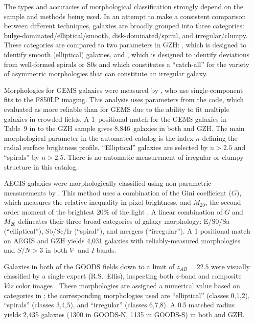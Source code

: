 \documentclass[twocolumn]{aastex6}
\begin{document}
The types and accuracies of morphological classification strongly depend on the sample and methods being used. In an attempt to make a consistent comparison between different techniques, galaxies are broadly grouped into three categories: bulge-dominated/elliptical/smooth, disk-dominated/spiral, and irregular/clumpy. These categories are compared to two parameters in GZH: \pbest, which is designed to identify smooth (elliptical) galaxies, and \podd, which is designed to identify deviations from well-formed spirals or S0s and which constitutes a ``catch-all'' for the variety of asymmetric morphologies that can constitute an irregular galaxy. 

Morphologies for GEMS galaxies were measured by \citet{hau07}, who use single-component \sersic{} fits to the F850LP imaging. This analysis uses parameters from the \galfit{} code, which \citet{hau07} evaluated as more reliable than \gimtwod{} for GEMS due to the ability to fit multiple galaxies in crowded fields. A 1\arcsec~positional match for the GEMS galaxies in Table~9 in \citet{hau07} to the GZH sample gives 8,846~galaxies in both \citet{hau07} and GZH. The main morphological parameter in the automated catalog is the \sersic{} index $n$ defining the radial surface brightness profile. ``Elliptical'' galaxies are selected by $n>2.5$ and ``spirals''  by $n>2.5$. There is no automatic measurement of irregular or clumpy structure in this catalog. 

AEGIS galaxies were morphologically classified using non-parametric measurements by \citet{lot08}. This method uses a combination of the Gini coefficient ($G$), which measures the relative inequality in pixel brightness, and $M_{20}$, the second-order moment of the brightest 20\% of the light \citep{lot04}. A linear combination of $G$ and $M_{20}$ delineates their three broad categories of galaxy morphology: E/S0/Sa (``elliptical''), Sb/Sc/Ir (``spiral''), and mergers (``irregular''). A 1\arcsec{} positional match on AEGIS and GZH yields 4,031 galaxies with reliably-measured morphologies and $S/N>3$ in both $V$- and $I$-bands. 

Galaxies in both of the GOODS fields down to a limit of $z_{AB}=22.5$ were visually classified by a single expert (R.S.~Ellis), inspecting both $z$-band and composite $Viz$ color images \citep{bun05}. These morphologies are assigned a numerical value based on categories in \citet{bri98a}; the corresponding morphologies used are ``elliptical'' (classes 0,1,2), ``spirals'' (classes 3,4,5), and ``irregular'' (classes 6,7,8). A 0.5\arcsec{} matched radius yields 2,435 galaxies (1300 in GOODS-N, 1135 in GOODS-S) in both \citet{bun05} and GZH.  
\end{document}
